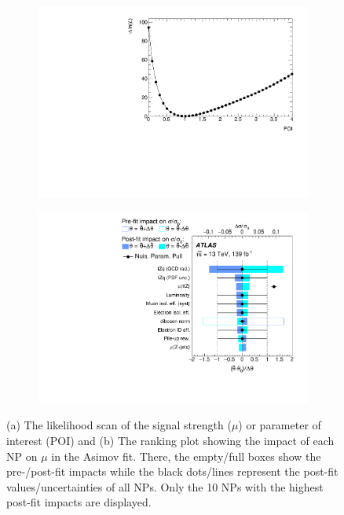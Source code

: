 \begin{figure}[!h] 
  \begin{subfigure}[b]{0.49\linewidth}
    \centering
    \includegraphics[width=\textwidth]{ubonn-thesis/Chapters/Chapters_07/Figure/Asmiov/NLLscan_POI.pdf}
    \caption{}
    \label{fig:asimovNLL}
  \end{subfigure}%
  \begin{subfigure}[b]{0.49\linewidth}
    \centering
    \includegraphics[width=\textwidth]{ubonn-thesis/Chapters/Chapters_07/Figure/Asmiov/RankingSysts_POI_systs.pdf}
   \caption{}
   \label{fig:ranking_asimov_R}
  \end{subfigure}
  \caption{(a) The likelihood scan of the signal strength ($\mu$) or parameter of interest (POI) and (b) The ranking plot showing the impact of each NP on $\mu$ in the Asimov fit. There, the empty/full boxes show the pre-/post-fit impacts while the black dots/lines represent the post-fit values/uncertainties of all NPs. Only the 10 NPs with the highest post-fit impacts are displayed.}
  \label{fig:ranking_asimov}
\end{figure}

